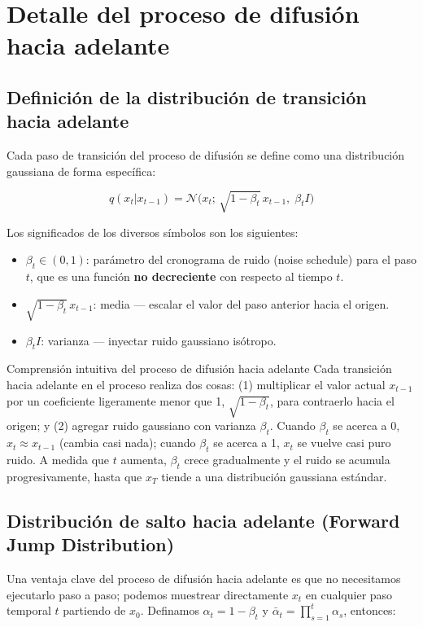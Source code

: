 \section{Detalle del proceso de difusión hacia adelante}

\subsection{Definición de la distribución de transición hacia adelante}

Cada paso de transición del proceso de difusión se define como una distribución gaussiana de forma específica:

$$q(x_t | x_{t-1}) = \mathcal{N}\big(x_t;\, \sqrt{1 - \beta_t}\, x_{t-1},\; \beta_t I\big)$$

Los significados de los diversos símbolos son los siguientes:
\begin{itemize}
    \item $\beta_t \in (0, 1)$: parámetro del cronograma de ruido (noise schedule) para el paso $t$, que es una función \textbf{no decreciente} con respecto al tiempo $t$.
    \item $\sqrt{1 - \beta_t}\, x_{t-1}$: media — escalar el valor del paso anterior hacia el origen.
    \item $\beta_t I$: varianza — inyectar ruido gaussiano isótropo.
\end{itemize}

\begin{importantbox}{Comprensión intuitiva del proceso de difusión hacia adelante}
Cada transición hacia adelante en el proceso realiza dos cosas: (1) multiplicar el valor actual $x_{t-1}$ por un coeficiente ligeramente menor que 1, $\sqrt{1-\beta_t}$, para contraerlo hacia el origen; y (2) agregar ruido gaussiano con varianza $\beta_t$. Cuando $\beta_t$ se acerca a 0, $x_t \approx x_{t-1}$ (cambia casi nada); cuando $\beta_t$ se acerca a 1, $x_t$ se vuelve casi puro ruido. A medida que $t$ aumenta, $\beta_t$ crece gradualmente y el ruido se acumula progresivamente, hasta que $x_T$ tiende a una distribución gaussiana estándar.
\end{importantbox}

\subsection{Distribución de salto hacia adelante (Forward Jump Distribution)}

Una ventaja clave del proceso de difusión hacia adelante es que no necesitamos ejecutarlo paso a paso; podemos muestrear directamente $x_t$ en cualquier paso temporal $t$ partiendo de $x_0$. Definamos $\alpha_t = 1 - \beta_t$ y $\bar{\alpha}_t = \prod_{s=1}^{t} \alpha_s$, entonces:

